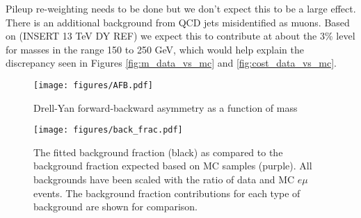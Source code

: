 \documentclass[
    10pt, %
    a4paper, %
    oneside, %
    headinclude,footinclude, %
    BCOR5mm, %
]{scrartcl}
\begin{document}
    Pileup re-weighting needs to be done but we don't expect this to be a large effect. \\

    There is an additional background from QCD jets misidentified as muons. Based on (INSERT 13 TeV DY REF) we expect this to contribute at
    about the 3\% level for masses in the range 150 to 250 GeV, which would help explain the discrepancy seen in 
    Figures \ref{fig:m_data_vs_mc} and \ref{fig:cost_data_vs_mc}. \\







    \begin{figure}[h]
        \texttt{[image: figures/AFB.pdf]}
        \caption{Drell-Yan forward-backward asymmetry as a function of mass}
        \label{fig:AFB}
    \end{figure}

    \begin{figure}[h]
        \texttt{[image: figures/back\_frac.pdf]}
        \caption{The fitted background fraction (black) as compared to the 
            background fraction expected based on MC samples (purple). 
            All backgrounds have been scaled with the ratio of data and MC $ e \mu$ events.
            The background fraction contributions for each type of background are shown for comparison. 
            }
        \label{fig:back_frac}
    \end{figure}




    
    


    
\end{document}
